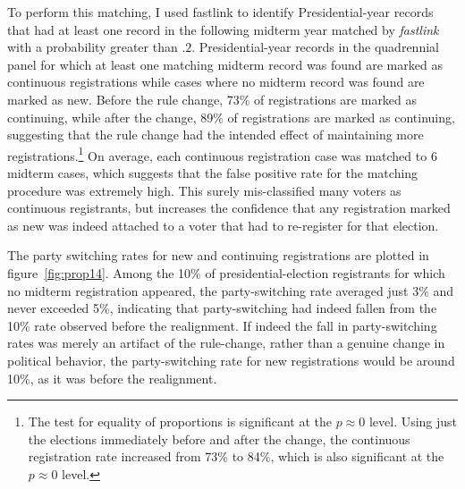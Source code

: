 \documentclass[11pt]{scrartcl}\usepackage[]{graphicx}\usepackage[]{color}
\begin{document}
To perform this matching, I used fastlink to identify Presidential-year records that had at least one record in the following midterm year matched by \emph{fastlink} with a probability  greater than $.2$. Presidential-year records in the quadrennial panel for which at least one matching midterm record was found are marked as continuous registrations while cases where no midterm record was found are marked as new. Before the rule change, 73\% of registrations are marked as continuing, while after the change, 89\% of registrations are marked as continuing, suggesting that the rule change had the intended effect of maintaining more registrations.\footnote{The test for equality of proportions is significant at the $p \approx 0$ level. Using just the elections immediately before and after the change, the continuous registration rate increased from 73\% to 84\%, which is also significant at the  $p \approx 0$ level. } On average, each continuous registration case was matched to 6 midterm cases, which suggests that the false positive rate for the matching procedure was extremely high. This surely mis-classified many voters as continuous registrants, but increases the confidence that any registration marked as new was indeed attached to a voter that had to re-register for that election.

The party switching rates for new and continuing registrations are plotted in figure~\ref{fig:prop14}. Among the 10\% of presidential-election registrants for which no midterm registration appeared, the party-switching rate averaged just 3\% and never exceeded 5\%, indicating that party-switching had indeed fallen from the 10\% rate observed before the realignment. If indeed the fall in party-switching rates was merely an artifact of the rule-change, rather than a genuine change in political behavior, the party-switching rate for new registrations would be around 10\%, as it was before the realignment.
\end{document}
